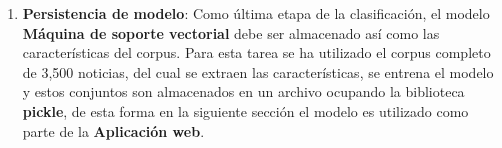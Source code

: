\begin{enumerate}
  \item \textbf{Persistencia de modelo}: Como última etapa de la clasificación, el modelo \textbf{Máquina de soporte vectorial} debe ser almacenado así como las características del corpus. Para esta tarea se ha utilizado el corpus completo de 3,500 noticias, del cual se extraen las características, se entrena el modelo y estos conjuntos son almacenados en un archivo ocupando la biblioteca \textbf{pickle}, de esta forma en la siguiente sección el modelo es utilizado como parte de la \textbf{Aplicación web}.

\end{enumerate}
